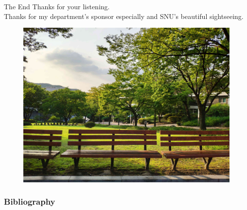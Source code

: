 \documentclass[10pt, compress,british,xcolor={svgnames,dvipsnames,x11names},trans]{beamer}
\begin{document}
\begin{frame}{The End}
Thanks for your listening. \\
Thanks for my department's sponsor especially and SNU's beautiful sightseeing.
\begin{figure}
\centering
\includegraphics[width=0.9\linewidth]{figures/sightseeing_chair.jpg}
\end{figure}

    
\end{frame}

\appendix

\begin{frame}[allowframebreaks]
\frametitle{Bibliography}


\nocite{*}
\printbibliography[heading=none]

\end{frame}
\end{document}

